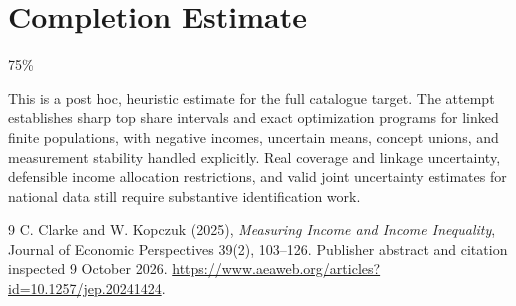 \documentclass[11pt]{article}
\theoremstyle{remark}\newtheorem{remark}[theorem]{Remark}
\begin{document}
\section{Completion Estimate}
75\%

This is a post hoc, heuristic estimate for the full catalogue target.
The attempt establishes sharp top share intervals and exact optimization programs for linked finite populations, with negative incomes, uncertain means, concept unions, and measurement stability handled explicitly. Real coverage and linkage uncertainty, defensible income allocation restrictions, and valid joint uncertainty estimates for national data still require substantive identification work.

\begin{thebibliography}{9}
 C. Clarke and W. Kopczuk (2025), \emph{Measuring Income and Income Inequality}, Journal of Economic Perspectives 39(2), 103--126. Publisher abstract and citation inspected 9 October 2026. \url{https://www.aeaweb.org/articles?id=10.1257/jep.20241424}.
\end{thebibliography}
\end{document}
